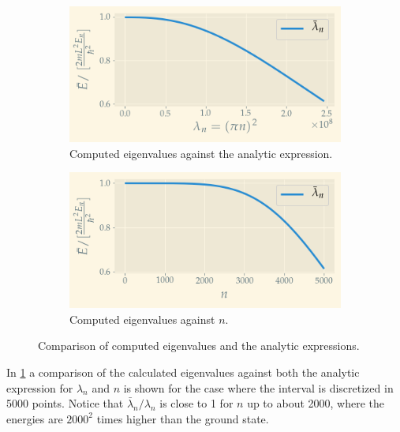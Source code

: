 \begin{figure}
	\centering
	\begin{subfigure}{0.5\textwidth}
	\centering
	\includegraphics[width=\linewidth]{img/e_vs_lambda_N=5000}
	\caption{Computed eigenvalues against the analytic expression.}
	\end{subfigure}
	\hfill
	\begin{subfigure}{0.5\textwidth}
	\centering
	\includegraphics[width=\linewidth]{img/e_vs_n_N=5000}
	\caption{Computed eigenvalues against $n$.}
	\end{subfigure}
	\caption{Comparison of computed eigenvalues and the analytic expressions. }
	\label{fig:energy_comparison}
\end{figure}
In \cref{fig:energy_comparison} a comparison of the calculated eigenvalues against both the analytic expression for $\lambda_n$ and $n$ is shown for the case where the interval is discretized in 5000 points.  Notice that $\bar\lambda_n / \lambda_n$ is close to 1 for $n$ up to about 2000, where the energies are $2000^2$ times higher than the ground state.



